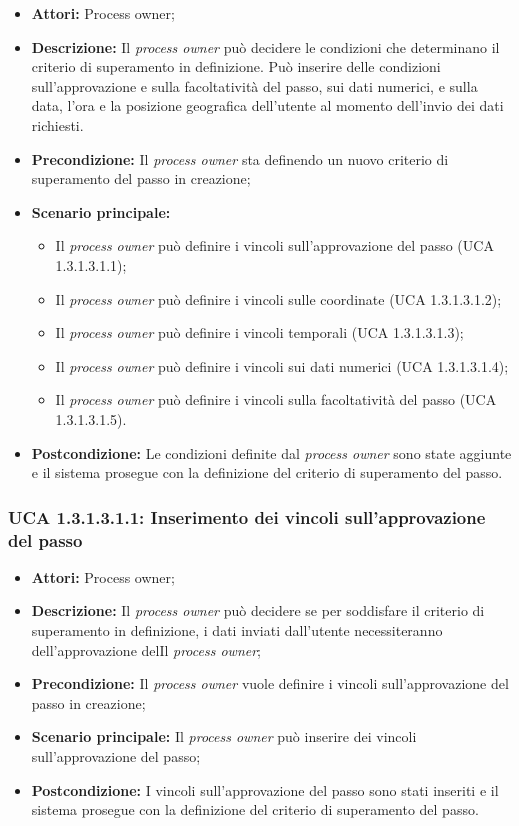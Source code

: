 \begin{itemize}
\item \textbf{Attori:} Process owner;
\item \textbf{Descrizione:}
Il \textit{process owner} può decidere le condizioni che determinano il criterio di superamento in definizione.
Può inserire delle condizioni sull'approvazione e sulla facoltatività del passo, sui dati numerici, e sulla data, l'ora e la posizione geografica dell'utente al momento dell'invio dei dati richiesti.
\item \textbf{Precondizione:}
Il \textit{process owner} sta definendo un nuovo criterio di superamento del passo in creazione;
\item \textbf{Scenario principale:}
\begin{itemize}
\item Il \textit{process owner} può definire i vincoli sull'approvazione del passo (UCA 1.3.1.3.1.1);
\item Il \textit{process owner} può definire i vincoli sulle coordinate (UCA 1.3.1.3.1.2);
\item Il \textit{process owner} può definire i vincoli temporali (UCA 1.3.1.3.1.3);
\item Il \textit{process owner} può definire i vincoli sui dati numerici (UCA 1.3.1.3.1.4);
\item Il \textit{process owner} può definire i vincoli sulla facoltatività del passo (UCA 1.3.1.3.1.5).
\end{itemize}
\item \textbf{Postcondizione:}
Le condizioni definite dal \textit{process owner} sono state aggiunte e il sistema prosegue con la definizione del criterio di superamento del passo.
\end{itemize}

\hypertarget{A1.3.1.3.1.1}{}
\subsubsection{UCA 1.3.1.3.1.1: Inserimento dei vincoli sull'approvazione del passo}
\begin{itemize}
\item \textbf{Attori:} Process owner;
\item \textbf{Descrizione:}
Il \textit{process owner} può decidere se per soddisfare il criterio di superamento in definizione, i dati inviati dall'utente necessiteranno dell'approvazione delIl \textit{process owner};
\item \textbf{Precondizione:}
Il \textit{process owner} vuole definire i vincoli sull'approvazione del passo in creazione;
\item \textbf{Scenario principale:}
Il \textit{process owner} può inserire dei vincoli sull'approvazione del passo;
\item \textbf{Postcondizione:}
I vincoli sull'approvazione del passo sono stati inseriti e il sistema prosegue con la definizione del criterio di superamento del passo.
\end{itemize}

